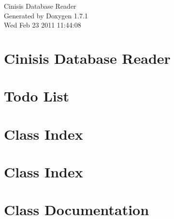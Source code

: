 \documentclass[a4paper]{book}
\begin{document}
\hypersetup{pageanchor=false}
\begin{titlepage}
\vspace*{7cm}
\begin{center}
{\Large Cinisis Database Reader }\\
\vspace*{1cm}
{\large Generated by Doxygen 1.7.1}\\
\vspace*{0.5cm}
{\small Wed Feb 23 2011 11:44:08}\\
\end{center}
\end{titlepage}
\clearemptydoublepage
{}
\tableofcontents
\clearemptydoublepage
{}
\hypersetup{pageanchor=true}
\chapter{Cinisis Database Reader}
\label{index}\hypertarget{index}{}
\chapter{Todo List}
\label{todo}
\hypertarget{todo}{}

\chapter{Class Index}

\chapter{Class Index}

\chapter{Class Documentation}





















\printindex
\end{document}
